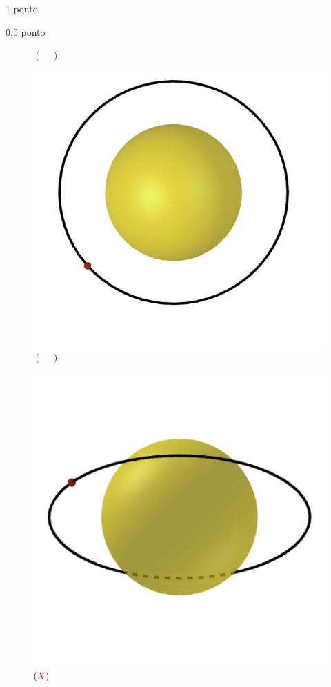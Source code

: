\documentclass{../lista}
\begin{document}
\begin{questao}{1 ponto}
\begin{pergunta}{0,5 ponto}
\begin{multicols}{3}
\begin{figure}[H]
					\captionsetup{labelformat=empty}
					\caption{$(\quad)$}
				\end{figure}
				\begin{figure}[H]
					\centering
					\includegraphics[scale=0.2]{./img/5b5.png}
					\captionsetup{labelformat=empty}
					\caption{$(\quad)$}
				\end{figure}
				\begin{figure}[H]
					\centering
					\includegraphics[scale=0.2]{./img/5b6.png}
					\captionsetup{labelformat=empty}
					\caption{$(\textcolor{red}{X})$}
				\end{figure}
			\end{multicols}
		\end{pergunta}


\end{questao}
\end{document}
